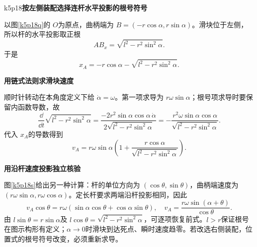 \LectureAnswerSection

\begin{drillsolution}{k5p18}\textbf{按左侧装配选择连杆水平投影的根号符号}\par\nobreak
以图\ref{k5p18q}的 $O$为原点，曲柄端为 $B=(-r\cos\alpha,r\sin\alpha)$。滑块位于左侧，所以杆的水平投影取正根
\[AB_x=\sqrt{l^2-r^2\sin^2\alpha}.\]
于是
\[x_A=-r\cos\alpha-\sqrt{l^2-r^2\sin^2\alpha}.
\]


\par\medskip{}\noindent\textbf{用链式法则求滑块速度}\par\nobreak
顺时针转动在本角度定义下给 $\dot\alpha=\omega$。第一项求导为 $r\omega\sin\alpha$；根号项求导时要保留内函数导数，故
\[\frac{\dd}{\dd t}\sqrt{l^2-r^2\sin^2\alpha}
=\frac{-2r^2\sin\alpha\cos\alpha\,\dot\alpha}{2\sqrt{l^2-r^2\sin^2\alpha}}
=-\frac{r^2\omega\sin\alpha\cos\alpha}{\sqrt{l^2-r^2\sin^2\alpha}}.
\]
代入 $x_A$的导数得到
\[\boxed{v_A=r\omega\sin\alpha
\left(1+\frac{r\cos\alpha}{\sqrt{l^2-r^2\sin^2\alpha}}\right)}.
\]



\par\medskip{}\noindent\textbf{用沿杆速度投影独立核验}\par\nobreak
图\ref{k5p18s}给出另一种计算：杆的单位方向为 $(\cos\theta,\sin\theta)$，曲柄端速度为 $(r\omega\sin\alpha,r\omega\cos\alpha)$。定长杆要求两端沿杆投影相同，因此
\[v_A\cos\theta=r\omega(\sin\alpha\cos\theta+\cos\alpha\sin\theta),
\quad v_A=\frac{r\omega\sin(\alpha+\theta)}{\cos\theta}.
\]
由 $l\sin\theta=r\sin\alpha$及 $l\cos\theta=\sqrt{l^2-r^2\sin^2\alpha}$，可逐项恢复前式。$l>r$保证根号在图示构形有定义；$\alpha\to0$时滑块到达死点、瞬时速度趋零。若改选右侧装配，位置式的根号符号改变，必须重新求导。\end{drillsolution}


